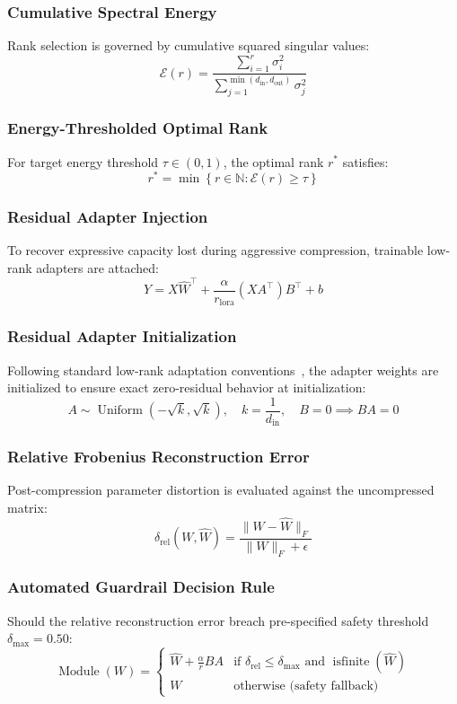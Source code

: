 \subsubsection{Cumulative Spectral Energy}
Rank selection is governed by cumulative squared singular values:
\[
\mathcal{E}(r) = \frac{\sum_{i=1}^{r} \sigma_i^2}{\sum_{j=1}^{\min(d_{\text{in}}, d_{\text{out}})} \sigma_j^2}
\]

\subsubsection{Energy-Thresholded Optimal Rank}
For target energy threshold $\tau \in (0, 1)$, the optimal rank $r^*$ satisfies:
\[
r^* = \min \left\{ r \in \mathbb{N} : \mathcal{E}(r) \ge \tau \right\}
\]

\subsubsection{Residual Adapter Injection}
To recover expressive capacity lost during aggressive compression, trainable low-rank adapters are attached:
\[
Y = X \hat{W}^\top + \frac{\alpha}{r_{\text{lora}}} (X A^\top) B^\top + b
\]

\subsubsection{Residual Adapter Initialization}
Following standard low-rank adaptation conventions~\citep{hu2022lora}, the adapter weights are initialized to ensure exact zero-residual behavior at initialization:
\[
A \sim \operatorname{Uniform}(-\sqrt{k}, \sqrt{k}), \quad k = \frac{1}{d_{\text{in}}}, \quad B = 0 \implies B A = 0
\]

\subsubsection{Relative Frobenius Reconstruction Error}
Post-compression parameter distortion is evaluated against the uncompressed matrix:
\[
\delta_{\text{rel}}(W, \hat{W}) = \frac{\|W - \hat{W}\|_F}{\|W\|_F + \epsilon}
\]

\subsubsection{Automated Guardrail Decision Rule}
Should the relative reconstruction error breach pre-specified safety threshold $\delta_{\text{max}} = 0.50$:
\[
\operatorname{Module}(W) = \begin{cases} \hat{W} + \frac{\alpha}{r} B A & \text{if } \delta_{\text{rel}} \le \delta_{\text{max}} \text{ and } \operatorname{isfinite}(\hat{W}) \\ W & \text{otherwise (safety fallback)} \end{cases}
\]

